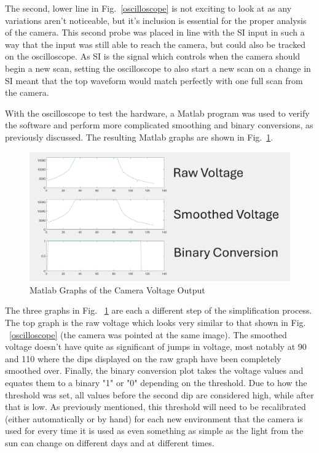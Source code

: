 \documentclass[conference]{IEEEtran}
\begin{document}
The second, lower line in Fig.~\ref{oscilloscope} is not exciting to look at
as any variations aren't noticeable, but it's inclusion is essential for the
proper analysis of the camera. This second probe was placed in line with the
SI input in such a way that the input was still able to reach the camera, but
could also be tracked on the oscilloscope. As SI is the signal which controls
when the camera should begin a new scan, setting the oscilloscope to also
start a new scan on a change in SI meant that the top waveform would match
perfectly with one full scan from the camera.

With the oscilloscope to test the hardware, a Matlab program was used to
verify the software and perform more complicated smoothing and binary
conversions, as previously discussed. The resulting Matlab graphs are shown in
Fig.~\ref{matlab}.

\begin{figure}
    \centering
    \includegraphics[width=\linewidth]{images/part3matlab.png}
    \caption{Matlab Graphs of the Camera Voltage Output}
    \label{matlab}
\end{figure}

The three graphs in Fig. ~\ref{matlab} are each a different step of the
simplification process. The top graph is the raw voltage which looks very
similar to that shown in Fig. ~\ref{oscilloscope} (the camera was pointed at
the same image). The smoothed voltage doesn't have quite as significant of
jumps in voltage, most notably at 90 and 110 where the dips displayed on the
raw graph have been completely smoothed over. Finally, the binary conversion
plot takes the voltage values and equates them to a binary "1" or "0"
depending on the threshold. Due to how the threshold was set, all values
before the second dip are considered high, while after that is low. As
previously mentioned, this threshold will need to be recalibrated (either
automatically or by hand) for each new environment that the camera is used for
every time it is used as even something as simple as the light from the sun
can change on different days and at different times.
\end{document}
